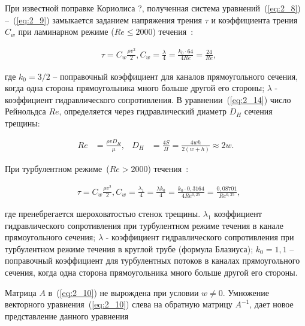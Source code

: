 При известной поправке Кориолиса ?, полученная система уравнений~(\ref{eq:2_8}) –~(\ref{eq:2_9}) замыкается заданием напряжения трения $\tau$ и коэффициента трения $C_w$ при ламинарном режиме ($Re \leq 2000$) течения~\cite{Idel4ik1}:

\begin{align}

&\tau = C_w \frac{\rho v^2 }{2} ,  C_w  = \frac{\lambda}{4} = \frac{k_0 \cdot 64}{4 Re} = \frac{24}{Re}, \label{eq:2_14}

\end{align}

где $k_0 = 3/2$ – поправочный коэффициент для каналов прямоугольного сечения, когда одна сторона прямоугольника много больше другой его стороны; $\lambda$ - коэффициент гидравлического сопротивления. В уравнении~(\ref{eq:2_14}) число Рейнольдса $Re$, определяется через гидравлический диаметр $D_H$ сечения трещины:

\begin{align}

Re &= \frac{\rho v D_H }{\mu} , & D_H & = \frac{4S}{\Pi} = \frac{4wh }{2 \left(w+h\right)} \approx 2w. \label{eq:2_15}

\end{align}



При турбулентном режиме~($Re>2000$) течения~\cite{Idel4ik1}:

\begin{align}

&\tau = C_w \frac{\rho v^2 }{2} ,  C_w  = \frac{\lambda_1}{4}= \frac{\lambda k_0}{4} = \frac{k_0 \cdot 0,3164}{4 Re^{0,25}} = \frac{0,08701}{Re^{0,25}}, \label{eq:2_16}

\end{align}

где пренебрегается шероховатостью стенок трещины. $\lambda_1$ коэффициент гидравлического сопротивления при турбулентном режиме течения в канале прямоугольного сечения; $\lambda$ - коэффициент гидравлического сопротивления при турбулентном режиме течения в круглой трубе (формула Блазиуса); $k_0 = 1,1$ – поправочный коэффициент для турбулентных потоков в каналах прямоугольного сечения, когда одна сторона прямоугольника много больше другой его стороны.



 \label{sec:3}

Матрица $A$ в~(\ref{eq:2_10}) не вырождена при условии $w \neq 0$. Умножение векторного уравнения~(\ref{eq:2_10}) слева на обратную матрицу $A^{-1}$, дает новое представление данного уравнения

